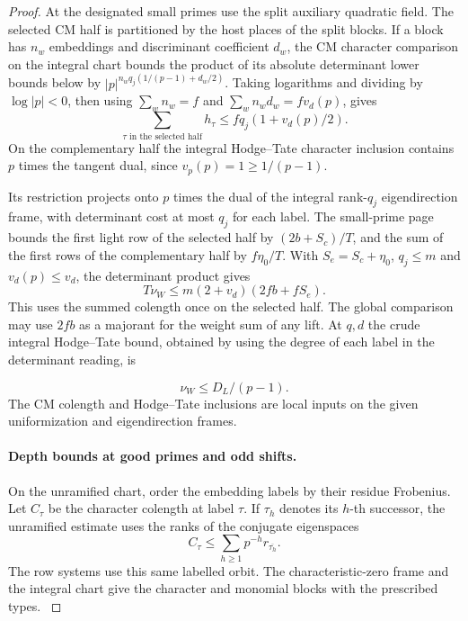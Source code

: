 \begin{proof}
At the designated small primes use the split auxiliary
quadratic field. The selected CM half is partitioned by the
host places of the split blocks. If a block has \(n_w\)
embeddings and discriminant coefficient \(d_w\), the CM
character comparison on the integral chart bounds the
product of its absolute determinant lower bounds below by
\(|p|^{n_wq_j(1/(p-1)+d_w/2)}\).
Taking logarithms and dividing by \(\log|p|<0\), then using
\(\sum_w n_w=f\) and \(\sum_w n_w d_w=fv_d(p)\), gives
\[
        \sum_{\tau\text{ in the selected half}} h_\tau
            \le fq_j(1+v_d(p)/2).
\]
On the complementary half the integral Hodge--Tate
character inclusion contains \(p\) times the tangent
dual, since \(v_p(p)=1\ge1/(p-1)\).

Its restriction projects onto \(p\) times the dual of the
integral rank-\(q_j\) eigendirection frame, with determinant
cost at most \(q_j\) for each label.
The small-prime page bounds the first light row of the
selected half by \((2b+S_c)/T\), and the sum of the first
rows of the complementary half by \(f\eta_0/T\).
With \(S_e=S_c+\eta_0\), \(q_j\le m\) and
\(v_d(p)\le v_d\), the determinant product gives
\begin{equation}\label{eq:light-small-prime-depth}
              T\nu_W\le m(2+v_d)(2fb+fS_e).
\end{equation}
This uses the summed colength once on the selected half.
The global comparison may use \(2fb\) as a majorant for
the weight sum of any lift. At \(q,d\) the crude integral
Hodge--Tate bound, obtained by using the degree of each
label in the determinant reading, is

\[
  \nu_W\le D_L/(p-1).
\]
The CM colength and Hodge--Tate inclusions are local inputs
on the given uniformization and eigendirection frames.
\label{cor:slice-unscaled-depth-4}

\paragraph{Depth bounds at good primes and odd shifts.}
On the unramified chart, order the embedding labels by their
residue Frobenius. Let \(C_\tau\) be the character colength at label \(\tau\). If \(\tau_h\) denotes its \(h\)-th successor, the unramified estimate uses the ranks of the conjugate eigenspaces
\[
  C_\tau\le\sum_{h\ge1}p^{-h}r_{\overline{\tau_h}}.
\]
 The row systems use this same
labelled orbit. The characteristic-zero frame and the
integral chart give the character and monomial blocks with
the prescribed types.
\label{cor:slice-unscaled-depth-5}


\end{proof}
